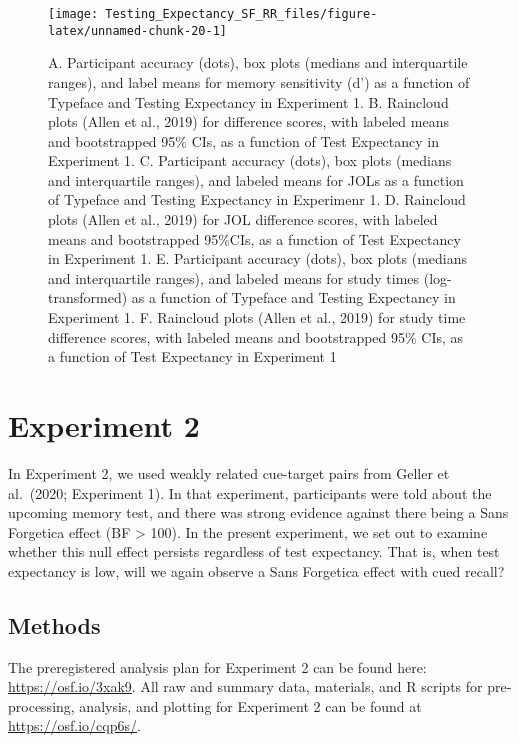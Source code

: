 \documentclass[
  english,
  jou]{apa7}
\begin{document}
\begin{figure}

{\centering \texttt{[image: Testing\_Expectancy\_SF\_RR\_files/figure-latex/unnamed-chunk-20-1]} 

}

\caption{A. Participant accuracy (dots), box plots (medians and interquartile ranges), and label means for memory sensitivity (d') as a function of Typeface and Testing Expectancy in Experiment 1. B. Raincloud plots (Allen et al., 2019) for difference scores, with labeled means and bootstrapped 95\% CIs, as a function of Test Expectancy in Experiment 1. C. Participant accuracy (dots), box plots (medians and interquartile ranges), and labeled means for JOLs as a function of Typeface and Testing Expectancy in Experimenr 1. D. Raincloud plots (Allen et al., 2019) for JOL difference scores, with labeled means and bootstrapped 95\%CIs, as a function of Test Expectancy in Experiment 1. E. Participant accuracy (dots), box plots (medians and interquartile ranges), and labeled means for study times (log-transformed) as a function of Typeface and Testing Expectancy in Experiment 1. F. Raincloud plots (Allen et al., 2019) for study time difference scores, with labeled means and bootstrapped 95\% CIs, as a function of Test Expectancy in Experiment 1}\label{fig:unnamed-chunk-20}
\end{figure}

\hypertarget{experiment-2}{%
\section{Experiment 2}\label{experiment-2}}

In Experiment 2, we used weakly related cue-target pairs from Geller et al.~(2020; Experiment 1). In that experiment, participants were told about the upcoming memory test, and there was strong evidence against there being a Sans Forgetica effect (BF \textgreater{} 100). In the present experiment, we set out to examine whether this null effect persists regardless of test expectancy. That is, when test expectancy is low, will we again observe a Sans Forgetica effect with cued recall?

\hypertarget{methods}{%
\subsection{Methods}\label{methods}}

The preregistered analysis plan for Experiment 2 can be found here: \url{https://osf.io/3xak9}. All raw and summary data, materials, and R scripts for pre-processing, analysis, and plotting for Experiment 2 can be found at \url{https://osf.io/cqp6s/}.
\end{document}
